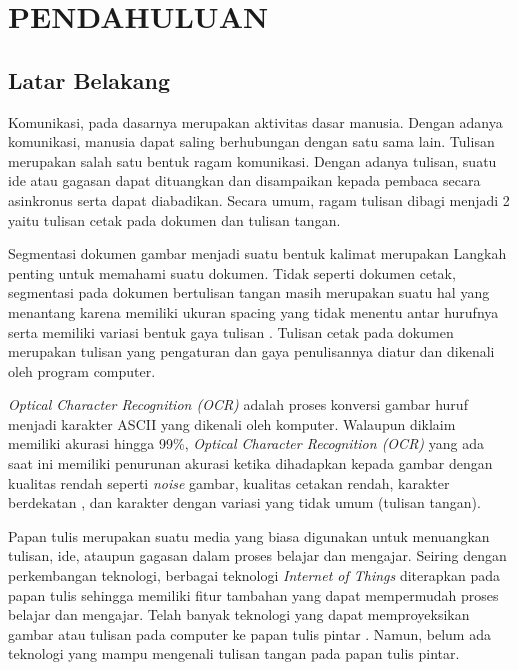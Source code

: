 \section{PENDAHULUAN}

\subsection{Latar Belakang}

Komunikasi, pada dasarnya merupakan aktivitas dasar manusia. Dengan adanya komunikasi, manusia dapat saling berhubungan dengan satu sama lain. Tulisan merupakan salah satu bentuk ragam komunikasi. Dengan adanya tulisan, suatu ide atau gagasan dapat dituangkan dan disampaikan kepada pembaca secara asinkronus serta dapat diabadikan. Secara umum, ragam tulisan dibagi menjadi 2 yaitu tulisan cetak pada dokumen dan tulisan tangan.\par
Segmentasi dokumen gambar menjadi suatu bentuk kalimat merupakan Langkah penting untuk memahami suatu dokumen. Tidak seperti dokumen cetak, segmentasi pada dokumen bertulisan tangan masih merupakan suatu hal yang menantang karena memiliki ukuran spacing yang tidak menentu antar hurufnya serta memiliki variasi bentuk gaya tulisan \citep*{ryu2015word}. Tulisan cetak pada dokumen merupakan tulisan yang pengaturan dan gaya penulisannya diatur dan dikenali oleh program computer.\par
\textit{Optical Character Recognition (OCR)} adalah proses konversi gambar huruf menjadi karakter ASCII yang dikenali oleh komputer. Walaupun diklaim memiliki akurasi hingga 99\%, \textit{Optical Character Recognition (OCR)} yang ada saat ini memiliki penurunan akurasi ketika dihadapkan kepada gambar dengan kualitas rendah seperti \textit{noise} gambar, kualitas cetakan rendah, karakter berdekatan \citep*{ImageMalu2001approachtch}, dan karakter dengan variasi yang tidak umum (tulisan tangan).\par
Papan tulis merupakan suatu media yang biasa digunakan untuk menuangkan tulisan, ide, ataupun gagasan dalam proses belajar dan mengajar. Seiring dengan perkembangan teknologi, berbagai teknologi \textit{Internet of Things} diterapkan pada papan tulis sehingga memiliki fitur tambahan yang dapat mempermudah proses belajar dan mengajar. Telah banyak teknologi yang dapat memproyeksikan gambar atau tulisan pada computer ke papan tulis pintar \citep*{kellerman2018smart}. Namun, belum ada teknologi yang mampu mengenali tulisan tangan pada papan tulis pintar.



